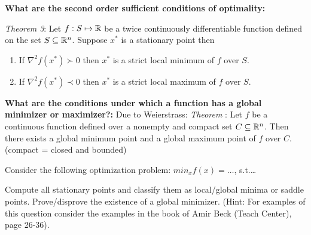 \documentclass[12pt,a4paper]{article}
\begin{document}
	
	\textbf{What are the second order sufficient conditions of optimality:}
	
		\textit{Theorem 3}: Let $f : S \mapsto \mathbb{R}$ be a twice continuously differentiable function defined on the set 
		$S \subseteq \mathbb{R}^n$. Suppose $x^*$ is a stationary point then
		\begin{enumerate}[i:]
			\item If $\nabla^2f(x^*) \succ 0$ then $x^*$ is a strict local minimum of $f$ over $S$.
			\item If $\nabla^2f(x^*) \prec 0$ then $x^*$ is a strict local maximum of $f$ over $S$.
		\end{enumerate} 
	
 	 
 	 \textbf{ What are the conditions under which a function has a global minimizer or maximizer?:}
 	 		Due to Weierstrass: \textit{Theorem} : Let $f$ be a continuous function defined over a nonempty and compact set $C \subseteq \mathbb{R}^n$. Then there exists a global minimum point and a global maximum point of $f$ over $C$. (compact = closed and bounded)
 	 		



\begin{question}
Consider the following optimization problem:
$min_x f(x) = \ldots$, s.t.\ldots

Compute all stationary points and classify them as local/global minima
or saddle points. Prove/disprove the existence of a global minimizer.
(Hint: For examples of this question consider the examples in the book of
Amir Beck (Teach Center), page 26-36).
\end{question}
\end{document}
